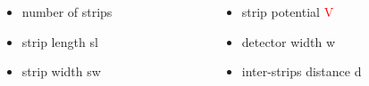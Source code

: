 \documentclass[14pt]{beamer}
\begin{document}
\begin{frame}
\begin{figure}[H]
\begin{center}
\begin{tikzpicture}[scale=0.7]
	\end{tikzpicture}
\end{center}
\end{figure}

\begin{columns}
  \begin{column}{0.5\textwidth}

    \begin{itemize}
      \item number of strips
      \item strip length \textcolor{black!40!green}{sl}
      \item strip width \textcolor{black!40!green}{sw}
    \end{itemize}

  \end{column}

  \begin{column}{0.6\textwidth}
    \begin{itemize}
      \item strip potential \textcolor{red}{V}
      \item detector width \textcolor{black!40!green}{w}
      \item inter-strips distance \textcolor{black!40!green}{d}
    \end{itemize}

  \end{column}
\end{columns}

\end{frame}
\end{document}
